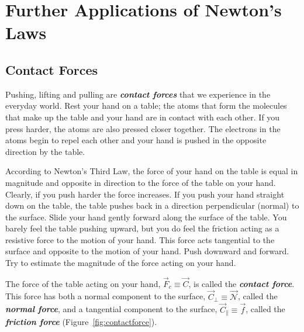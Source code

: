 \chapter{Further Applications of Newton's Laws}

\section{Contact Forces}

Pushing, lifting and pulling are \textbf{\textit{contact forces}} that we experience in the everyday world. Rest your hand on a table; the atoms that form the molecules that make up the table and your hand are in contact with each other. If you press harder, the atoms are also pressed closer together. The electrons in the atoms begin to repel each other and your hand is pushed in the opposite direction by the table.

According to Newton's Third Law, the force of your hand on the table is equal in magnitude and opposite in direction to the force of the table on your hand. Clearly, if you push harder the force increases. If you push your hand straight down on the table, the table pushes back in a direction perpendicular (normal) to the surface. Slide your hand gently forward along the surface of the table. You barely feel the table pushing upward, but you do feel the friction acting as a resistive force to the motion of your hand. This force acts tangential to the surface and opposite to the motion of your hand. Push downward and forward. Try to estimate the magnitude of the force acting on your hand.

The force of the table acting on your hand, $\vec{F}_{c} \equiv \vec{C}$, is called the \textbf{\textit{contact force}}. This force has both a normal component to the surface, $\vec{C}_{\perp} \equiv \vec{\mathscr{N}}$, called the \textbf{\textit{normal force}}, and a tangential component to the surface, $\vec{C}_{\parallel} \equiv \vec{f}$, called the \textbf{\textit{friction force}} (Figure~\ref{fig:contactforce}).



